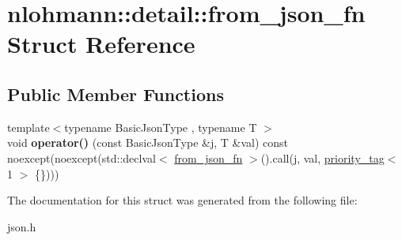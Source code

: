 \hypertarget{structnlohmann_1_1detail_1_1from__json__fn}{}\section{nlohmann\+:\+:detail\+:\+:from\+\_\+json\+\_\+fn Struct Reference}
\label{structnlohmann_1_1detail_1_1from__json__fn}
\subsection*{Public Member Functions}
\begin{DoxyCompactItemize}
\item 
\mbox{\label{structnlohmann_1_1detail_1_1from__json__fn_a48e82ad9d244fdf249caa970a253e214}} 
{\footnotesize template$<$typename Basic\+Json\+Type , typename T $>$ }\\void {\bfseries operator()} (const Basic\+Json\+Type \&j, T \&val) const noexcept(noexcept(std\+::declval$<$ \hyperlink{structnlohmann_1_1detail_1_1from__json__fn}{from\+\_\+json\+\_\+fn} $>$().call(j, val, \hyperlink{structnlohmann_1_1detail_1_1priority__tag}{priority\+\_\+tag}$<$ 1 $>$ \{\})))
\end{DoxyCompactItemize}


The documentation for this struct was generated from the following file\+:\begin{DoxyCompactItemize}
\item 
json.\+h\end{DoxyCompactItemize}
